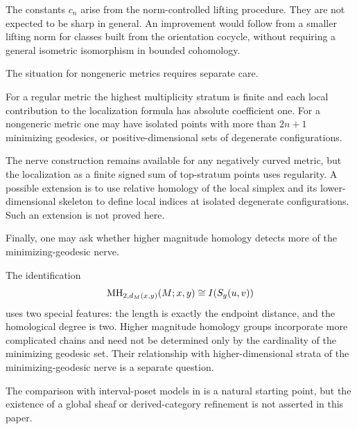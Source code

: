 The constants $c_n$ arise from the
norm-controlled lifting procedure.
They are not expected to be sharp in
general. An improvement would follow
from a smaller lifting norm for classes
built from the orientation cocycle,
without requiring a general isometric
isomorphism in bounded cohomology.

The situation for nongeneric metrics requires separate care.

For a regular metric the highest
multiplicity stratum is finite and each
local contribution to the localization
formula has absolute coefficient one.
For a nongeneric metric one may have
isolated points with more than $2n+1$
minimizing geodesics, or positive-dimensional
sets of degenerate configurations.

The nerve construction remains available
for any negatively curved metric, but
the localization as a finite signed sum
of top-stratum points uses regularity.
A possible extension is to use relative
homology of the local simplex and its
lower-dimensional skeleton to define
local indices at isolated degenerate
configurations. Such an extension is
not proved here.

Finally, one may ask whether higher magnitude homology detects more of the minimizing-geodesic nerve.

The identification
\[
 \mathrm{MH}_{2,d_M(x,y)}(M;x,y)\cong I(S_g(u,v))
\]
uses two special features: the length
is exactly the endpoint distance,
and the homological degree is two.
Higher magnitude homology groups
incorporate more complicated chains
and need not be determined only by
the cardinality of the minimizing
geodesic set. Their relationship
with higher-dimensional strata of
the minimizing-geodesic nerve is
a separate question.

The comparison with interval-poset
models in \cite{KanetaYoshinaga2021}
is a natural starting point, but
the existence of a global sheaf or
derived-category refinement is not
asserted in this paper.
